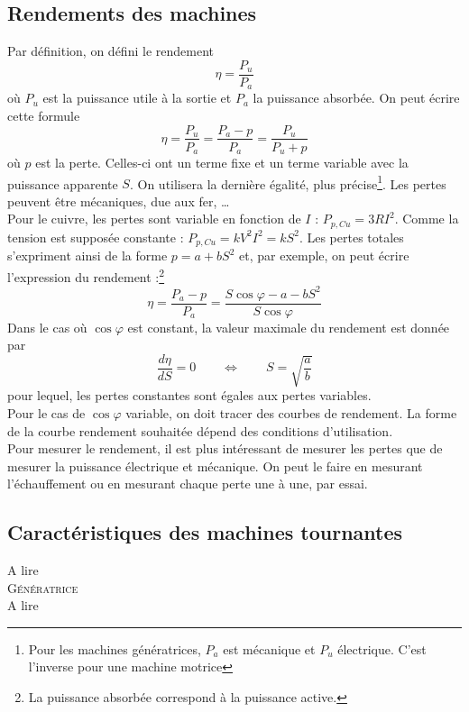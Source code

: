 	\subsection{Rendements des machines}
	Par définition, on défini le rendement 
	\begin{equation}
	\eta = \frac{P_u}{P_a}
	\end{equation}
	où $P_u$ est la puissance utile à la sortie et $P_a$ la puissance 
	absorbée. On peut écrire cette formule
	\begin{equation}
	\eta = \frac{P_u}{P_a} = \frac{P_a-p}{P_a} = \frac{P_u}{P_u+p}
	\end{equation}
	où $p$ est la perte. Celles-ci ont un terme fixe et un terme variable avec 
	la puissance apparente $S$. On utilisera la dernière égalité, plus précise\footnote{
	Pour les machines génératrices, $P_a$ est mécanique et $P_u$ électrique. C'est 
	l'inverse pour une machine motrice}. Les pertes peuvent être mécaniques, 
	due aux fer, \dots\\
	
	Pour le cuivre, les pertes sont variable en fonction de $I$ : $P_{p,Cu} = 3
	RI^2$. Comme la tension est supposée constante : $P_{p,Cu} = kV^2I^2 = kS^2$. 
	Les pertes totales s'expriment ainsi de la forme $p = a+bS^2$ et, par exemple, 
	on peut écrire l'expression du rendement :\footnote{La puissance absorbée correspond à la puissance active.}
	\begin{equation}
	\eta = \frac{P_a-p}{P_a} = \dfrac{S\cos\varphi-a-bS^2}{S\cos\varphi}
	\end{equation}
	Dans le cas où $\cos \varphi$ est constant, la valeur maximale du rendement est donnée par
	\begin{equation}
	\frac{d\eta}{dS} = 0\qquad \Leftrightarrow\qquad S = \sqrt{\frac{a}{b}}
	\end{equation}
	pour lequel, les pertes constantes sont égales aux pertes variables. \\
	Pour le cas de $\cos \varphi$ variable, on doit tracer des courbes de rendement. 
	La forme de la courbe rendement souhaitée dépend des conditions d'utilisation.\\
	Pour mesurer le rendement, il est plus intéressant de mesurer les pertes que 
	de mesurer la puissance électrique et mécanique. On peut le faire en mesurant 
	l'échauffement ou en mesurant chaque perte une à une, par essai.
	
	
	\subsection{Caractéristiques des machines tournantes}
	A lire\\
	
	\textsc{Génératrice}\\
	A lire
		
		
		
		
		
		
		
		
		
		
		
		
		
		
